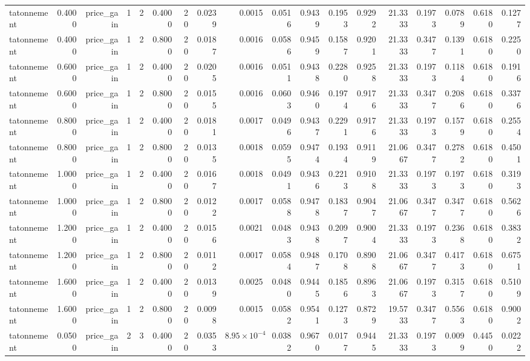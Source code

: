 \begin{table}[htbp]
\begin{tabular}{lrrrrrrrrrrrrrrrrr}
tatonnement & 0.4000 & price\_gain & 1 & 2 & 0.4000 & 20 & 0.0239 & 0.0015 & 0.0516 & 0.9439 & 0.1953 & 0.9292 & 21.3333 & 0.1973 & 0.0789 & 0.6180 & 0.1277 \\
tatonnement & 0.4000 & price\_gain & 1 & 2 & 0.8000 & 20 & 0.0187 & 0.0016 & 0.0586 & 0.9459 & 0.1587 & 0.9201 & 21.3333 & 0.3477 & 0.1391 & 0.6180 & 0.2250 \\
tatonnement & 0.6000 & price\_gain & 1 & 2 & 0.4000 & 20 & 0.0205 & 0.0016 & 0.0511 & 0.9438 & 0.2280 & 0.9258 & 21.3333 & 0.1973 & 0.1184 & 0.6180 & 0.1916 \\
tatonnement & 0.6000 & price\_gain & 1 & 2 & 0.8000 & 20 & 0.0155 & 0.0016 & 0.0603 & 0.9460 & 0.1974 & 0.9176 & 21.3333 & 0.3477 & 0.2086 & 0.6180 & 0.3376 \\
tatonnement & 0.8000 & price\_gain & 1 & 2 & 0.4000 & 20 & 0.0181 & 0.0017 & 0.0496 & 0.9437 & 0.2291 & 0.9176 & 21.3333 & 0.1973 & 0.1579 & 0.6180 & 0.2554 \\
tatonnement & 0.8000 & price\_gain & 1 & 2 & 0.8000 & 20 & 0.0135 & 0.0018 & 0.0595 & 0.9474 & 0.1934 & 0.9119 & 21.0667 & 0.3477 & 0.2782 & 0.6180 & 0.4501 \\
tatonnement & 1.0000 & price\_gain & 1 & 2 & 0.4000 & 20 & 0.0167 & 0.0018 & 0.0491 & 0.9436 & 0.2213 & 0.9108 & 21.3333 & 0.1973 & 0.1973 & 0.6180 & 0.3193 \\
tatonnement & 1.0000 & price\_gain & 1 & 2 & 0.8000 & 20 & 0.0122 & 0.0017 & 0.0588 & 0.9478 & 0.1837 & 0.9047 & 21.0667 & 0.3477 & 0.3477 & 0.6180 & 0.5626 \\
tatonnement & 1.2000 & price\_gain & 1 & 2 & 0.4000 & 20 & 0.0156 & 0.0021 & 0.0483 & 0.9438 & 0.2097 & 0.9004 & 21.3333 & 0.1973 & 0.2368 & 0.6180 & 0.3832 \\
tatonnement & 1.2000 & price\_gain & 1 & 2 & 0.8000 & 20 & 0.0112 & 0.0017 & 0.0584 & 0.9487 & 0.1708 & 0.8908 & 21.0667 & 0.3477 & 0.4173 & 0.6180 & 0.6751 \\
tatonnement & 1.6000 & price\_gain & 1 & 2 & 0.4000 & 20 & 0.0139 & 0.0025 & 0.0480 & 0.9445 & 0.1856 & 0.8963 & 21.0667 & 0.1973 & 0.3157 & 0.6180 & 0.5109 \\
tatonnement & 1.6000 & price\_gain & 1 & 2 & 0.8000 & 20 & 0.0098 & 0.0015 & 0.0582 & 0.9541 & 0.1273 & 0.8729 & 19.5733 & 0.3477 & 0.5563 & 0.6180 & 0.9002 \\
tatonnement & 0.0500 & price\_gain & 2 & 3 & 0.4000 & 20 & 0.0353 & $8.95\times10^{-4}$ & 0.0382 & 0.9670 & 0.0177 & 0.9445 & 21.3333 & 0.1973 & 0.0099 & 0.4450 & 0.0222 \\

\end{tabular}
\end{table}
